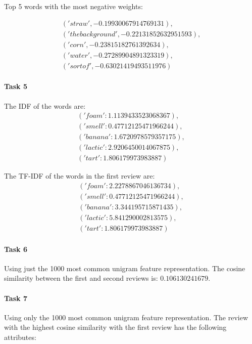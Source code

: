 \documentclass[a4paper,11pt]{article}
\theoremstyle{mytheor}
\begin{document}
Top 5 words with the most negative weights:

\begin{align}
('straw', -0.19930067914769131), \\('the background', -0.22131852632951593), \\('corn', -0.23815182761392634), \\('water', -0.27289904891323319), \\('sort of', -0.63021419493511976)
 \end{align}

\clearpage

\paragraph{Task 5}

The IDF of the words are:
\begin{align}
('foam': 1.1139433523068367), \\('smell': 0.47712125471966244), \\('banana': 1.6720978579357175), \\('lactic': 2.9206450014067875), \\('tart': 1.806179973983887)
\end{align}

The TF-IDF of the words in the first review are:
\begin{align}
('foam': 2.2278867046136734), \\('smell': 0.47712125471966244), \\('banana': 3.344195715871435), \\('lactic': 5.841290002813575), \\('tart': 1.806179973983887)
\end{align}

\paragraph{Task 6}

Using just the 1000 most common unigram feature representation. The cosine similarity between the first and second reviews is: $0.106130241679$. 

\paragraph{Task 7}

Using only the 1000 most common unigram feature representation. The review with the highest cosine similarity with the first review has the following attributes:
\end{document}
